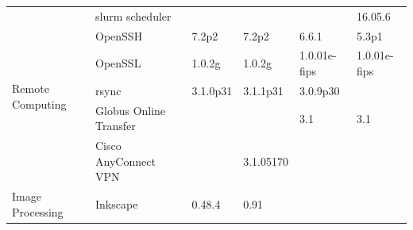 \begin{table}[!ht]
{\begin{tabular}{ll|l|l|l|l|}
\multicolumn{1}{|l}{\multirow{6}{*}{Remote Computing}} & \multicolumn{1}{|l|}{slurm scheduler}        &                                                                     &                                                                   &                                                                        & 16.05.6                                                     \\ \cline{2-6}
\multicolumn{1}{|l}{}                                  & \multicolumn{1}{|l|}{OpenSSH}                & 7.2p2                                                               & 7.2p2                                                             & 6.6.1                                                                  & 5.3p1                                                       \\ \cline{2-6}
\multicolumn{1}{|l}{}                                  & \multicolumn{1}{|l|}{OpenSSL}                & 1.0.2g                                                              & 1.0.2g                                                            & 1.0.01e-fips                                                           & 1.0.01e-fips                                                \\ \cline{2-6}
\multicolumn{1}{|l}{}                                  & \multicolumn{1}{|l|}{rsync}                  & 3.1.0p31                                                            & 3.1.1p31                                                          & 3.0.9p30                                                               &                                                             \\ \cline{2-6}
\multicolumn{1}{|l}{}                                  & \multicolumn{1}{|l|}{Globus Online Transfer} &                                                                     &                                                                   & 3.1                                                                    & 3.1                                                         \\ \cline{2-6}
\multicolumn{1}{|l}{}                                  & \multicolumn{1}{|l|}{Cisco AnyConnect VPN}   &                                                                     & 3.1.05170                                                         &                                                                        &                                                             \\ \hline
\multicolumn{1}{|l}{\multirow{3}{*}{Image Processing}} & \multicolumn{1}{|l|}{Inkscape}               & 0.48.4                                                              & 0.91                                                              &                                                                        &                                                             \\ \cline{2-6}

\end{tabular}}
\end{table}
